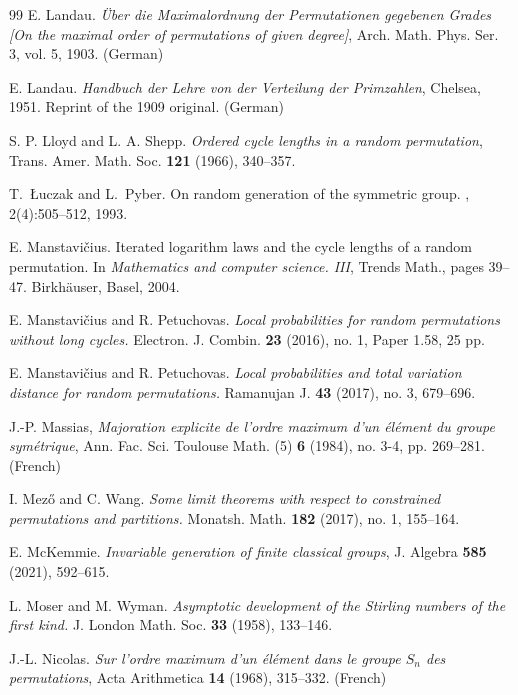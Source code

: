 \begin{thebibliography}{99}
 {\sc E. Landau}.
\emph{\" Uber die Maximalordnung der Permutationen gegebenen Grades [On the maximal order of permutations of given degree]}, 
Arch. Math. Phys. Ser. 3, vol. 5, 1903. (German)

 {\sc E. Landau}.
\emph{Handbuch der Lehre von der Verteilung der Primzahlen},
Chelsea, 1951.  Reprint of the 1909 original. (German)



{\sc S. P. Lloyd and  L. A. Shepp}.
\emph{Ordered cycle lengths in a random permutation},
Trans. Amer. Math. Soc. {\bf 121} (1966), 340--357. 

{\sc T.~{\L}uczak and L.~Pyber}.
\newblock On random generation of the symmetric group.
, 2(4):505--512, 1993.

{\sc E. Manstavi\v{c}ius}.
\newblock Iterated logarithm laws and the cycle lengths of a random
  permutation.
\newblock In {\em Mathematics and computer science. {III}}, Trends Math., pages
  39--47. Birkh\"{a}user, Basel, 2004.

{\sc E.  Manstavi\v{c}ius and R. Petuchovas}.
\emph{Local probabilities for random permutations without long cycles.} Electron. J. Combin. {\bf 23} (2016), no. 1, Paper 1.58, 25 pp.

{\sc E.  Manstavi\v{c}ius and R. Petuchovas}.
\emph{Local probabilities and total variation distance for random permutations.} Ramanujan J. {\bf 43} (2017), no. 3, 679--696.


{\sc J.-P. Massias}, \emph{Majoration explicite de l'ordre maximum d'un {\' e}l{\' e}ment du groupe sym{\' e}trique}, Ann. Fac. Sci. Toulouse Math. (5) {\bf 6} (1984), no. 3-4, pp. 269--281. (French)


{\sc I. Mez\H o and C. Wang}.
\emph{Some limit theorems with respect to constrained permutations and partitions.}
Monatsh. Math. {\bf 182} (2017), no. 1, 155--164. 
%

{\sc E. McKemmie}.
\emph{Invariable generation of finite classical groups},
 J. Algebra {\bf 585} (2021), 592--615. 


{\sc L. Moser and M. Wyman}.
\emph{Asymptotic development of the Stirling numbers of the first kind.}
J. London Math. Soc. {\bf 33} (1958), 133--146.

{\sc J.-L. Nicolas}. \emph{Sur l'ordre maximum d'un {\' e}l{\' e}ment dans le groupe $S_n$ des permutations}, Acta Arithmetica {\bf 14} (1968), 315--332. (French)


\end{thebibliography}
